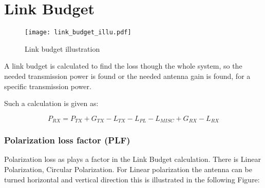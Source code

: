 \chapter{Link Budget}

\begin{figure}[H]
\centering
\texttt{[image: link\_budget\_illu.pdf]}
\caption{Link budget illustration}
\label{dijdkkfkf}
\end{figure}







A link budget is calculated to find the loss though the whole system, so the needed transmission power is found or the needed antenna gain is found, for a specific transmission power.

Such a calculation is given as:

\begin{equation}
P_{RX} = P_{TX} + G_{TX} - L_{TX} - L_{PL} - L_{MISC} + G_{RX} - L_{RX}
\label{link_calc}
\end{equation}

\begin{where}
\end{where}
\newpage
\subsection{Polarization loss factor (PLF)}
Polarization loss as plays a factor in the Link Budget calculation. There is Linear Polarization, Circular Polarization. For Linear polarization the antenna can be turned horizontal and vertical direction this is illustrated in the following Figure:


